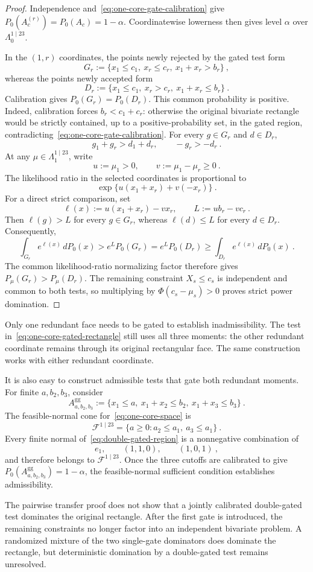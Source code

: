 \documentclass[12pt]{article}
\theoremstyle{remark}
\begin{document}
\begin{proof}
Independence and~\eqref{eq:one-core-gate-calibration} give
$P_0(A_c^{(r)})=P_0(A_c)=1-\alpha$.  Coordinatewise lowerness then gives
level $\alpha$ over $\Lambda^{1\mid23}_0$.

In the $(1,r)$ coordinates, the points newly rejected by the gated test form
\[
G_r
:=
\{x_1\le c_1,\ x_r\le c_r,\ x_1+x_r>b_r\}~,
\]
whereas the points newly accepted form
\[
D_r
:=
\{x_1\le c_1,\ x_r>c_r,\ x_1+x_r\le b_r\}~.
\]
Calibration gives $P_0(G_r)=P_0(D_r)$.  This common probability is positive.
Indeed, calibration forces $b_r<c_1+c_r$: otherwise the original bivariate
rectangle would be strictly contained, up to a positive-probability set, in
the gated region, contradicting~\eqref{eq:one-core-gate-calibration}.  For
every $g\in G_r$ and
$d\in D_r$,
\[
g_1+g_r>d_1+d_r,
\qquad
-g_r>-d_r~.
\]
At any $\mu\in\Lambda^{1\mid23}_1$, write
\[
u:=\mu_1>0,
\qquad
v:=\mu_1-\mu_r\ge0~.
\]
The likelihood ratio in the selected coordinates is proportional to
\[
\exp\{u(x_1+x_r)+v(-x_r)\}~.
\]
For a direct strict comparison, set
\[
\ell(x):=u(x_1+x_r)-v x_r,
\qquad
L:=u b_r-v c_r~.
\]
Then $\ell(g)>L$ for every $g\in G_r$, whereas $\ell(d)\le L$ for every
$d\in D_r$.  Consequently,
\[
\int_{G_r}e^{\ell(x)}\,dP_0(x)
>
e^L P_0(G_r)
=
e^L P_0(D_r)
\ge
\int_{D_r}e^{\ell(x)}\,dP_0(x)~.
\]
The common likelihood-ratio normalizing factor therefore gives
$P_\mu(G_r)>P_\mu(D_r)$.  The remaining constraint $X_s\le c_s$ is
independent and common to both tests, so multiplying by
$\Phi(c_s-\mu_s)>0$ proves strict power domination.
\end{proof}

Only one redundant face needs to be gated to establish inadmissibility.  The
test in~\eqref{eq:one-core-gated-rectangle} still uses all three moments: the
other redundant coordinate remains through its original rectangular face.
The same construction works with either redundant coordinate.

\enlargethispage{4\baselineskip}

It is also easy to construct admissible tests that gate both redundant
moments.  For finite $a,b_2,b_3$, consider
\begin{equation}\label{eq:double-gated-region}
A^{\mathrm{gg}}_{a,b_2,b_3}
:=
\{x_1\le a,\ x_1+x_2\le b_2,\ x_1+x_3\le b_3\}~.
\end{equation}
The feasible-normal cone for~\eqref{eq:one-core-space} is
\[
\mathcal F^{1\mid23}
=
\{a\ge0:a_2\le a_1,\ a_3\le a_1\}~.
\]
Every finite normal of~\eqref{eq:double-gated-region} is a nonnegative
combination of
\[
e_1,
\qquad
(1,1,0),
\qquad
(1,0,1)~,
\]
and therefore belongs to $\mathcal F^{1\mid23}$.  Once the three cutoffs are
calibrated to give $P_0(A^{\mathrm{gg}}_{a,b_2,b_3})=1-\alpha$, the
feasible-normal sufficient condition establishes admissibility.

The pairwise transfer proof does not show that a jointly calibrated
double-gated test dominates the original rectangle.  After the first gate is
introduced, the remaining constraints no longer factor into an independent
bivariate problem.  A randomized mixture of the two single-gate dominators
does dominate the rectangle, but deterministic domination by a double-gated
test remains unresolved.
\end{document}
